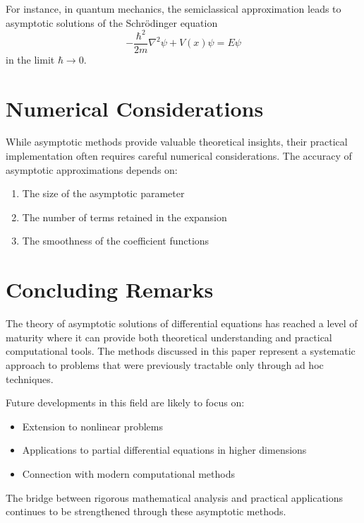 \documentclass[11pt]{article}
\begin{document}
For instance, in quantum mechanics, the semiclassical approximation leads to asymptotic solutions of the Schrödinger equation
\begin{equation}\label{eq:schrodinger}
-\frac{\hbar^2}{2m} \nabla^2 \psi + V(x) \psi = E \psi
\end{equation}
in the limit $\hbar \to 0$.

\section{Numerical Considerations}\label{sec:numerical}

While asymptotic methods provide valuable theoretical insights, their practical implementation often requires careful numerical considerations. The accuracy of asymptotic approximations depends on:

\begin{enumerate}
\item The size of the asymptotic parameter
\item The number of terms retained in the expansion
\item The smoothness of the coefficient functions
\end{enumerate}

\section{Concluding Remarks}\label{sec:conclusion}

The theory of asymptotic solutions of differential equations has reached a level of maturity where it can provide both theoretical understanding and practical computational tools. The methods discussed in this paper represent a systematic approach to problems that were previously tractable only through ad hoc techniques.

Future developments in this field are likely to focus on:
\begin{itemize}
\item Extension to nonlinear problems
\item Applications to partial differential equations in higher dimensions
\item Connection with modern computational methods
\end{itemize}

The bridge between rigorous mathematical analysis and practical applications continues to be strengthened through these asymptotic methods.
\end{document}
